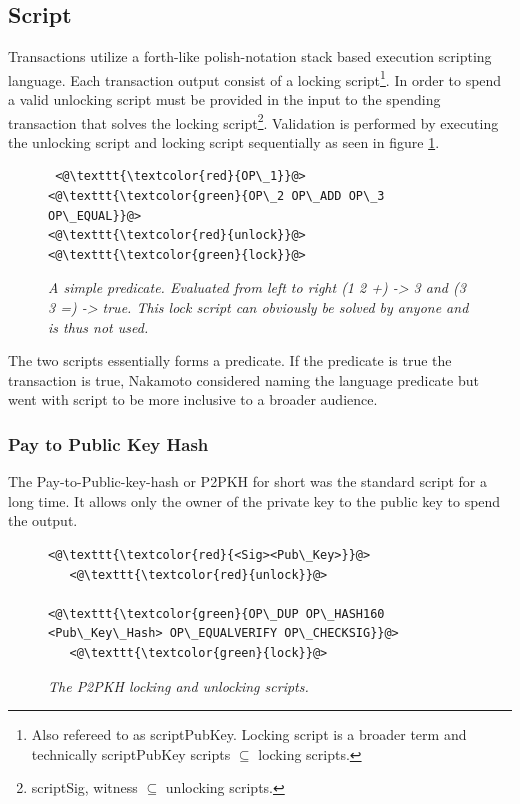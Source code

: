 \subsection{Script}

Transactions utilize a forth-like polish-notation stack based execution scripting language\cite{antonopoulos:mastering:bitcoin}. Each transaction output consist of a locking script\footnote{Also refereed to as scriptPubKey. Locking script is a broader term and technically scriptPubKey scripts $ \subseteq $ locking scripts.}. In order to spend a valid unlocking script must be provided in the input to the spending transaction that solves the locking script\footnote{scriptSig, witness $\subseteq $ unlocking scripts.}. Validation is performed by executing the unlocking script and locking script sequentially as seen in figure \ref{fig:simple:script}. 

\begin{figure}[!hbt]
	
	\begin{lstlisting}
 <@\texttt{\textcolor{red}{OP\_1}}@>   <@\texttt{\textcolor{green}{OP\_2 OP\_ADD OP\_3 OP\_EQUAL}}@>
<@\texttt{\textcolor{red}{unlock}}@>           <@\texttt{\textcolor{green}{lock}}@>
	\end{lstlisting}
	
	\caption{\textit{ A simple predicate. Evaluated from left to right (1 2 +) -> 3 and
			(3 3 =) -> true. This lock script can obviously be solved by anyone and is thus not used.
	}}
	\label{fig:simple:script}
\end{figure}

The two scripts essentially forms a predicate. If the predicate is true the transaction is true, Nakamoto considered naming the language predicate but went with script to be more inclusive to a broader audience\cite{nakamoto:predicate}.

\subsubsection{Pay to Public Key Hash}

The Pay-to-Public-key-hash or P2PKH for short was the standard script for a long time. It allows only the owner of 
the private key to the public key to spend the output.


\begin{figure}[!hbt]
	
	\begin{lstlisting}
<@\texttt{\textcolor{red}{<Sig><Pub\_Key>}}@>   
   <@\texttt{\textcolor{red}{unlock}}@>
   
<@\texttt{\textcolor{green}{OP\_DUP OP\_HASH160 <Pub\_Key\_Hash> OP\_EQUALVERIFY OP\_CHECKSIG}}@>
   <@\texttt{\textcolor{green}{lock}}@>
	\end{lstlisting}
	
	\caption{\textit{ The P2PKH locking and unlocking scripts.
	}}
	\label{fig:P2PKH}
\end{figure}

